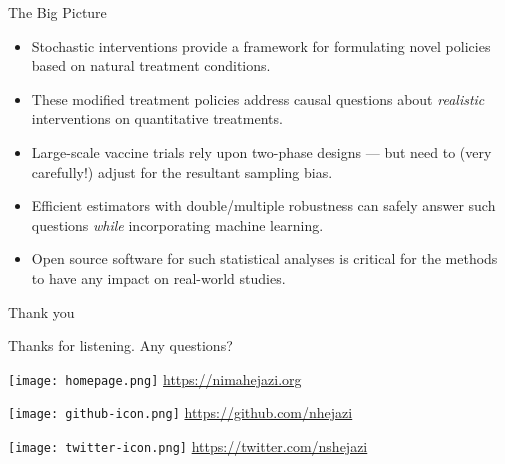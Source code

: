 \documentclass{beamer}
\begin{document}


\begin{frame}[c]{The Big Picture}

\begin{center}
\begin{itemize}
  \itemsep8pt
  \item Stochastic interventions provide a framework for formulating novel
    policies based on natural treatment conditions.
  \item These modified treatment policies address causal questions about
    \textit{realistic} interventions on quantitative treatments.
  \item Large-scale vaccine trials rely upon two-phase designs --- but need to
    (very carefully!) adjust for the resultant sampling bias.
  \item Efficient estimators with double/multiple robustness can safely answer
    such questions \textit{while} incorporating machine learning.
  \item Open source software for such statistical analyses is critical for the
    methods to have any impact on real-world studies.
\end{itemize}
\end{center}

\note{
}

\end{frame}


\begin{frame}[c]{Thank you}

\Large{Thanks for listening. Any questions?}

\vspace{2mm}
\texttt{[image: homepage.png]} \url{https://nimahejazi.org}

\vspace{2mm}
\texttt{[image: github-icon.png]}
  \url{https://github.com/nhejazi}

\vspace{2mm}
\texttt{[image: twitter-icon.png]}
  \url{https://twitter.com/nshejazi}

\end{frame}

\end{document}
